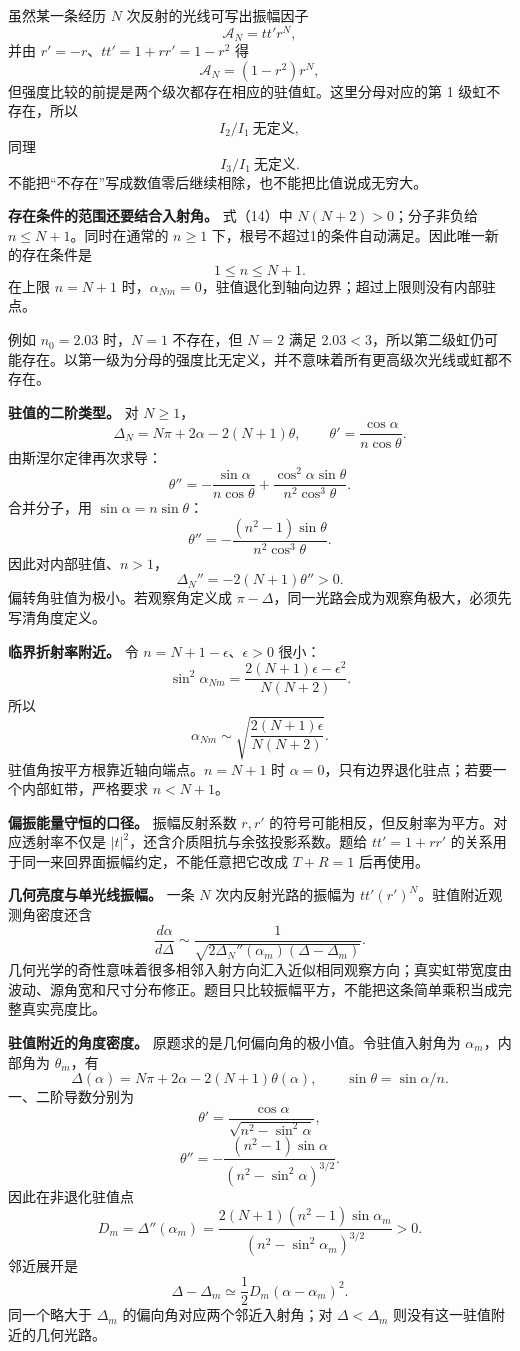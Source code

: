 \documentclass[12pt,a4paper,UTF8]{ctexart}
\begin{document}
虽然某一条经历 \(N\) 次反射的光线可写出振幅因子 \[
\mathcal A_N=tt' r^N, \tag{21}
\] 并由 \(r'=-r\)、\(tt'=1+rr'=1-r^2\) 得 \[
\mathcal A_N=(1-r^2)r^N, \tag{22}
\] 但强度比较的前提是两个级次都存在相应的驻值虹。这里分母对应的第 1
级虹不存在，所以 \[
\boxed{I_2/I_1\ \text{无定义}}, \tag{23}
\] 同理 \[
\boxed{I_3/I_1\ \text{无定义}}. \tag{24}
\] 不能把``不存在''写成数值零后继续相除，也不能把比值说成无穷大。

\textbf{存在条件的范围还要结合入射角。} 式（14）中
\(N(N+2)>0\)；分子非负给 \(n\le N+1\)。同时在通常的 \(n\ge1\)
下，根号不超过1的条件自动满足。因此唯一新的存在条件是 \[
\boxed{1\le n\le N+1}.
\] 在上限 \(n=N+1\)
时，\(\alpha_{Nm}=0\)，驻值退化到轴向边界；超过上限则没有内部驻点。

例如 \(n_0=2.03\) 时，\(N=1\) 不存在，但 \(N=2\) 满足
\(2.03<3\)，所以第二级虹仍可能存在。以第一级为分母的强度比无定义，并不意味着所有更高级次光线或虹都不存在。

\textbf{驻值的二阶类型。} 对 \(N\ge1\)， \[
\Delta_N=N\pi+2\alpha-2(N+1)\theta,\qquad
\theta'=\frac{\cos\alpha}{n\cos\theta}.
\] 由斯涅尔定律再次求导： \[
\theta''=-\frac{\sin\alpha}{n\cos\theta}
+\frac{\cos^2\alpha\sin\theta}{n^2\cos^3\theta}.
\] 合并分子，用 \(\sin\alpha=n\sin\theta\)： \[
\theta''=-\frac{(n^2-1)\sin\theta}{n^2\cos^3\theta}.
\] 因此对内部驻值、\(n>1\)， \[
\Delta_N''=-2(N+1)\theta''>0.
\] 偏转角驻值为极小。若观察角定义成
\(\pi-\Delta\)，同一光路会成为观察角极大，必须先写清角度定义。

\textbf{临界折射率附近。} 令 \(n=N+1-\epsilon\)、\(\epsilon>0\) 很小：
\[
\sin^2\alpha_{Nm}
=\frac{2(N+1)\epsilon-\epsilon^2}{N(N+2)}.
\] 所以 \[
\alpha_{Nm}\sim
\sqrt{\frac{2(N+1)\epsilon}{N(N+2)}}.
\] 驻值角按平方根靠近轴向端点。\(n=N+1\) 时
\(\alpha=0\)，只有边界退化驻点；若要一个内部虹带，严格要求 \(n<N+1\)。

\textbf{偏振能量守恒的口径。} 振幅反射系数 \(r,r'\)
的符号可能相反，但反射率为平方。对应透射率不仅是
\(|t|^2\)，还含介质阻抗与余弦投影系数。题给 \(tt'=1+rr'\)
的关系用于同一来回界面振幅约定，不能任意把它改成 \(T+R=1\) 后再使用。

\textbf{几何亮度与单光线振幅。} 一条 \(N\) 次内反射光路的振幅为
\(tt'(r')^N\)。驻值附近观测角密度还含 \[
\frac{d\alpha}{d\Delta}\sim
\frac1{\sqrt{2\Delta_N''(\alpha_m)(\Delta-\Delta_m)}}.
\]
几何光学的奇性意味着很多相邻入射方向汇入近似相同观察方向；真实虹带宽度由波动、源角宽和尺寸分布修正。题目只比较振幅平方，不能把这条简单乘积当成完整真实亮度比。

\textbf{驻值附近的角度密度。}
原题求的是几何偏向角的极小值。令驻值入射角为 \(\alpha_m\)，内部角为
\(\theta_m\)，有 \[
\Delta(\alpha)=N\pi+2\alpha-2(N+1)\theta(\alpha),
\qquad \sin\theta=\sin\alpha/n.
\] 一、二阶导数分别为 \[
\theta'=\frac{\cos\alpha}{\sqrt{n^2-\sin^2\alpha}},
\] \[
\theta''=-\frac{(n^2-1)\sin\alpha}
{(n^2-\sin^2\alpha)^{3/2}}.
\] 因此在非退化驻值点 \[
D_m=\Delta''(\alpha_m)
=\frac{2(N+1)(n^2-1)\sin\alpha_m}
{(n^2-\sin^2\alpha_m)^{3/2}}>0.
\] 邻近展开是 \[
\Delta-\Delta_m\simeq\frac12D_m(\alpha-\alpha_m)^2.
\] 同一个略大于 \(\Delta_m\) 的偏向角对应两个邻近入射角；对
\(\Delta<\Delta_m\) 则没有这一驻值附近的几何光路。
\end{document}
